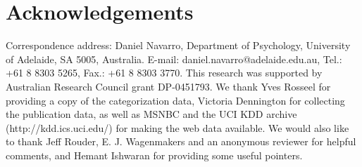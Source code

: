 \documentclass[authoryear]{elsarticle}
\newcommand{\acs}{}
\begin{document}
\section*{Acknowledgements}
Correspondence address: Daniel Navarro, Department of Psychology, University of
Adelaide, SA 5005, Australia. E-mail: daniel.navarro@adelaide.edu.au, Tel.:
+61 8 8303 5265, Fax.: +61 8 8303 3770. This research was supported by Australian
\acs Research Council grant DP-0451793. We thank Yves Rosseel
for \acs providing a copy of the categorization data, Victoria Dennington for collecting
the publication data, as well as MSNBC and the UCI KDD archive
(http://kdd.ics.uci.edu/) for making the web data available. We would also like to thank
Jeff Rouder, E. J. Wagenmakers and an anonymous reviewer for helpful comments,
and Hemant Ishwaran for providing some useful pointers.
\end{document}
